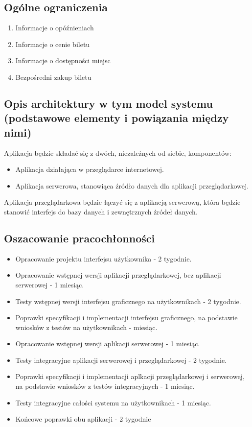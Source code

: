 \documentclass[12pt,a4paper]{report}
\begin{document}
\subsection{Ogólne ograniczenia}	
\begin{enumerate}
	\item Informacje o opóźnieniach
	\item Informacje o cenie biletu
	\item Informacje o dostępności miejsc
	\item Bezpośredni zakup biletu
\end{enumerate}
\subsection{Opis architektury w tym model systemu (podstawowe elementy i powiązania między nimi)}
Aplikacja będzie składać się z dwóch, niezależnych od siebie, komponentów:
\begin{itemize}
	\item Aplikacja działająca w przeglądarce internetowej.
	\item Aplikacja serwerowa, stanowiąca źródło danych dla aplikacji przeglądarkowej.
\end{itemize} 
	Aplikacja przeglądarkowa będzie łączyć się z aplikacją serwerową, która będzie stanowić interfejs do bazy danych i zewnętrznych źródeł danych.
\subsection{Oszacowanie pracochłonności}
\begin{itemize}
	\item Opracowanie projektu interfejsu użytkownika - 2 tygodnie.
	\item Opracowanie wstępnej wersji aplikacji przeglądarkowej, bez aplikacji serwerowej - 1 miesiąc.
	\item Testy wstępnej wersji interfejsu graficznego na użytkownikach - 2 tygodnie.
	\item Poprawki specyfikacji i implementacji interfejsu graficznego, na podstawie wniosków z testów na użytkownikach - miesiąc.
	\item Opracowanie wstępnej wersji aplikacji serwerowej - 1 miesiąc.
	\item Testy integracyjne aplikacji serwerowej i przeglądarkowej - 2 tygodnie.
	\item Poprawki specyfikacji i implementacji aplkacji przeglądarkowej i serwerowej, na podstawie wniosków z testów integracyjnych - 1 miesiąc.
	\item Testy integracyjne całości systemu na użytkownikach - 1 miesiąc.
	\item Końcowe poprawki obu aplikacji - 2 tygodnie 
\end{itemize}
\end{document}
